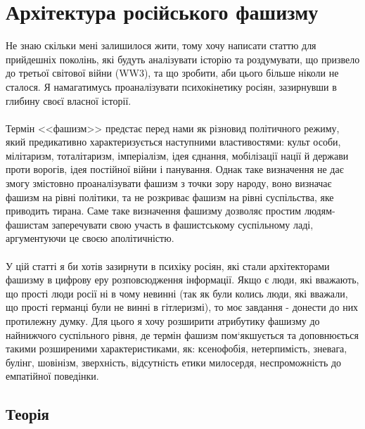 \section{Архітектура російського фашизму}

Не знаю скільки мені залишилося жити, тому хочу написати статтю для прийдешніх поколінь,
які будуть аналізувати історію та роздумувати, що призвело до третьої світової війни (WW3),
та що зробити, аби цього більше ніколи не сталося. Я намагатимусь проаналізувати
психокінетику росіян, зазирнувши в глибину своєї власної історії.
\\
\\
Термін <<фашизм>> предстає перед нами як різновид політичного режиму, який предикативно
характеризується наступними властивостями: культ особи, мілітаризм, тоталітаризм,
імперіалізм, ідея єднання, мобілізації нації й держави проти ворогів, ідея постійної
війни і панування. Однак таке визначення не дає змогу змістовно проаналізувати фашизм
з точки зору народу, воно визначає фашизм на рівні політики, та не розкриває фашизм
на рівні суспільства, яке приводить тирана. Саме таке визначення фашизму дозволяє
простим людям-фашистам заперечувати свою участь в фашистському суспільному ладі,
аргументуючи це своєю аполітичністю.
\\
\\
У цій статті я би хотів зазирнути в психіку росіян, які стали архітекторами фашизму
в цифрову еру розповсюдження інформації. Якщо є люди, які вважають, що прості люди
росії ні в чому невинні (так як були колись люди, які вважали, що прості германці
були не винні в гітлеризмі), то моє завдання - донести до них протилежну думку.
Для цього я хочу розширити атрибутику фашизму до найнижчого суспільного рівня,
де термін фашизм пом`якшується та доповнюється такими розширеними характеристиками,
як: ксенофобія, нетерпимість, зневага, булінг, шовінізм, зверхність, відсутність
етики милосердя, неспроможність до емпатійної поведінки.

\newpage
\subsection{Теорія}


